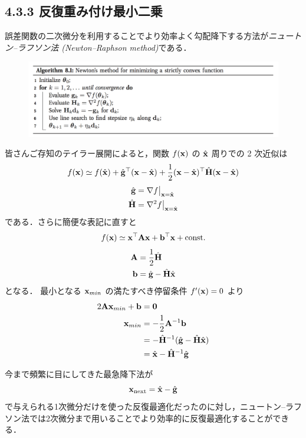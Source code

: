 \newpage
\subsection*{4.3.3 反復重み付け最小二乗}

誤差関数の二次微分を利用することでより効率よく勾配降下する方法が\emph{ニュートン--ラフソン法 (Newton--Raphson method)}である．

\begin{figure}[h]
  \centering
  \includegraphics[width=\linewidth]{./images/newtons_method.png}
\end{figure}

皆さんご存知のテイラー展開によると，関数 $f({\mathbf{x}})$ の $\hat{{\mathbf{x}}}$ 周りでの 2 次近似は
\[
  f({\mathbf{x}}) \simeq f(\hat{{\mathbf{x}}}) + \hat{{\mathbf{g}}}^\top ({\mathbf{x}} - \hat{{\mathbf{x}}}) + \frac{1}{2} ({\mathbf{x}} - \hat{{\mathbf{x}}})^\top \hat{{\mathbf{H}}} ({\mathbf{x}} - \hat{{\mathbf{x}}})
\]
\begin{align*}
  \hat{{\mathbf{g}}} & = \nabla f \big|_{{\mathbf{x}} = \hat{{\mathbf{x}}}} \\
  \hat{{\mathbf{H}}} & = \nabla^2 f \big|_{{\mathbf{x}} = \hat{{\mathbf{x}}}}
\end{align*}
である．さらに簡便な表記に直すと
\[
  f({\mathbf{x}}) \simeq {\mathbf{x}}^\top {\mathbf{A}} {\mathbf{x}} + {\mathbf{b}}^\top {\mathbf{x}} + \mathrm{const.}
\]
\begin{align*}
  {\mathbf{A}} & = \frac{1}{2} \hat{{\mathbf{H}}} \\
  {\mathbf{b}} & = \hat{{\mathbf{g}}} - \hat{{\mathbf{H}}} \hat{{\mathbf{x}}} 
\end{align*}
となる．
最小となる ${\mathbf{x}}_{min}$ の満たすべき停留条件 $f^\prime({\mathbf{x}}) = 0$ より
\begin{align*}
  2 {\mathbf{A}} {\mathbf{x}}_{min} + {\mathbf{b}} & = \mathbf{0} \\
  {\mathbf{x}}_{min} & = - \frac{1}{2} {\mathbf{A}}^{-1} {\mathbf{b}} \\
  & = - \hat{{\mathbf{H}}}^{-1} (\hat{{\mathbf{g}}} - \hat{{\mathbf{H}}} \hat{{\mathbf{x}}}) \\
  & = \hat{{\mathbf{x}}} - \hat{{\mathbf{H}}}^{-1} \hat{{\mathbf{g}}} 
\end{align*}
\begin{embedbox}
今まで頻繁に目にしてきた最急降下法が
\[
  {\mathbf{x}}_{\mathrm{next}} = \hat{{\mathbf{x}}} - \hat{{\mathbf{g}}}
\]
で与えられる1次微分だけを使った反復最適化だったのに対し，ニュートン--ラフソン法では2次微分まで用いることでより効率的に反復最適化することができる．
\end{embedbox}

